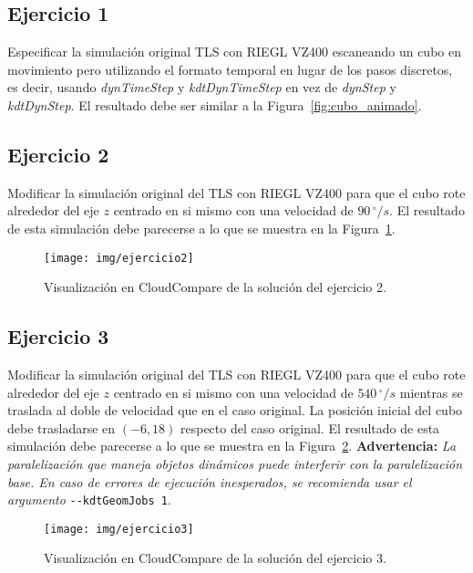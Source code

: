 \documentclass[]{article}
\begin{document}
	\pagebreak
	

	\subsection*{Ejercicio 1}
	Especificar la simulación original TLS con RIEGL VZ400 escaneando un cubo en movimiento pero utilizando el formato temporal en lugar de los pasos discretos, es decir, usando \textit{dynTimeStep} y \textit{kdtDynTimeStep} en vez de \textit{dynStep} y \textit{kdtDynStep}. El resultado debe ser similar a la Figura~\ref{fig:cubo_animado}.


	\subsection*{Ejercicio 2}
	Modificar la simulación original del TLS con RIEGL VZ400 para que el cubo rote alrededor del eje $z$ centrado en si mismo con una velocidad de $90\,^{\circ}/s$. El resultado de esta simulación debe parecerse a lo que se muestra en la Figura~\ref{fig:ejercicio2}.
	
	\begin{figure}[htb]
		\centering
		\texttt{[image: img/ejercicio2]}
		\caption{Visualización en CloudCompare de la solución del ejercicio 2.}
		\label{fig:ejercicio2}
	\end{figure}


	\subsection*{Ejercicio 3}
	Modificar la simulación original del TLS con RIEGL VZ400 para que el cubo rote alrededor del eje $z$ centrado en si mismo con una velocidad de $540\,^{\circ}/s$ mientras se traslada al doble de velocidad que en el caso original. La posición inicial del cubo debe trasladarse en $(-6, 18)$ respecto del caso original. El resultado de esta simulación debe parecerse a lo que se muestra en la Figura~\ref{fig:ejercicio3}. \textbf{Advertencia:} \textit{La paralelización que maneja objetos dinámicos puede interferir con la paralelización base. En caso de errores de ejecución inesperados, se recomienda usar el argumento} \verb|--kdtGeomJobs 1|. 
	
	\begin{figure}[htb]
		\centering
		\texttt{[image: img/ejercicio3]}
		\caption{Visualización en CloudCompare de la solución del ejercicio 3.}
		\label{fig:ejercicio3}
	\end{figure}
\end{document}
